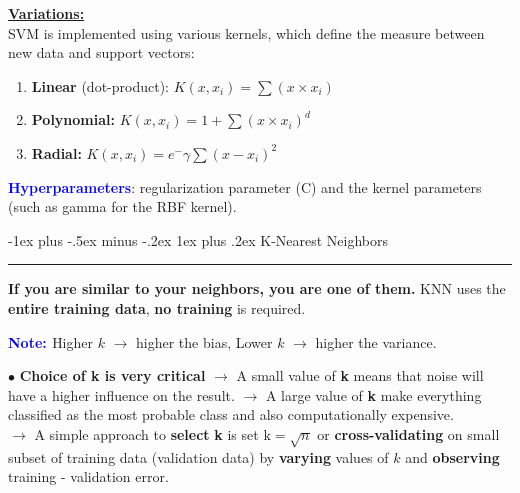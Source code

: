 \documentclass[letterpaper, 10.5pt,landscape]{article}
\makeatletter
\renewcommand{\subsubsection}{\@startsection{subsubsection}{3}{0mm}%
                                {-1ex plus -.5ex minus -.2ex}%
                                {1ex plus .2ex}%
                                {\normalfont\small\bfseries}}
\makeatother
\begin{document}
\begin{multicols*}{3}
\vspace{3pt}
\textbf{\underline{Variations:}} \\
SVM is implemented using various kernels, which define the
measure between new data and support vectors:
\vspace{-3pt}
\begin{enumerate}
    \item \textbf{Linear} (dot-product):  \hspace{5pt} \(\boxed{K(x, x_{i}) = \sum(x \times x_{i})} \)
    \vspace{-3pt}
    \item \textbf{Polynomial:}  \hspace{38pt} \( \boxed{K(x, x_{i}) = 1 + \sum(x \times x_{i})^{d} }\)
    \vspace{-3pt}
    \item \textbf{Radial:}  \hspace{55pt} \(\boxed{K(x, x_{i}) = e^-{\gamma \sum (x - x_{i})^{2}}}\)
\end{enumerate}




\textbf{\textcolor{blue}{Hyperparameters}}: regularization parameter (C) and the kernel parameters (such as gamma for the RBF kernel).








\subsubsection{K-Nearest Neighbors} {\color{teal}\hrule height 0.5pt} \smallskip

\textbf{If you are similar to your neighbors, you are one of them.}
KNN uses the \textbf{entire training data}, \textbf{no training} is required. 


\textbf{\textcolor{blue}{Note: }} Higher $k$ $\rightarrow$ higher the bias, Lower $k$ $\rightarrow$ higher the variance.

$\bullet$ \textbf{Choice of \textbf{k} is very critical} $\rightarrow$ A small value of \textbf{k} means that noise will have a higher influence on the result. 
$\rightarrow$ A large value of \textbf{k} make everything classified as the most probable class and also computationally expensive.\\

$\rightarrow$ A simple approach to \textbf{select} \textbf{k} is set $\boxed{\text{k} = \sqrt{n}}$ or \textbf{cross-validating} on small subset of training data (validation data) by \textbf{varying} values of $k$ and \textbf{observing} training - validation error. \\


\end{multicols*}
\end{document}
